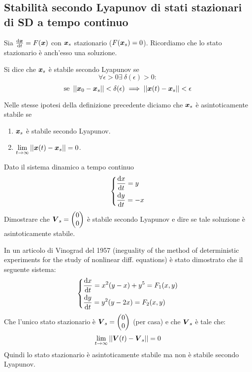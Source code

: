 \subsection{Stabilità secondo Lyapunov di stati stazionari di SD a tempo continuo}%
\label{sub:Stabilità secondo Lyapunov di stati stazionari di SD a tempo continuo}
Sia $\frac{\text{d} \boldsymbol{x}}{\text{d} t} = F(\boldsymbol{x})$  con $\boldsymbol{x}_s$ stazionario ($F(\boldsymbol{x}_s) = 0$). Ricordiamo che lo stato stazionario è anch'esso una soluzione.
\begin{defn}
    Si dice che $\boldsymbol{x}_s$ è stabile secondo Lyapunov se
    \[
	\forall \epsilon  > 0 \exists \ \delta (\epsilon) > 0:
    \] 
    \[
	\text{se } \left|\left|\boldsymbol{x}_0-\boldsymbol{x}_s\right|\right|< \delta (\epsilon) \implies  \left|\left|\boldsymbol{x} (t)-\boldsymbol{x}_s\right|\right| < \epsilon
    \] 
\end{defn}
\noindent
\begin{defn}
    Nelle stesse ipotesi della definizione precedente diciamo che $\boldsymbol{x}_s$ è asintoticamente stabile se 
    \begin{enumerate}
        \item $\boldsymbol{x}_s$ è stabile secondo Lyapunov.
	\item $\lim\limits_{t \to \infty} \left|\left|\boldsymbol{x} (t)-\boldsymbol{x}_s\right|\right|=0$.
    \end{enumerate}
\end{defn}
\noindent
\begin{ex}
    Dato il sistema dinamico a tempo continuo
    \[\begin{dcases}
        \frac{\text{d} x}{\text{d} t} = y\\
	\frac{\text{d} y}{\text{d} t} = -x
    \end{dcases}\] 
    Dimostrare che $\boldsymbol{V}_s= \begin{pmatrix} 0\\ 0 \end{pmatrix} $ è stabile secondo Lyapunov e dire se tale soluzione è asintoticamente stabile.
\end{ex}
\noindent
\begin{exmp}[Vinograd]
In un articolo di Vinograd del 1957 (ineguality of the method of deterministic experiments for the study of nonlinear diff. equations) è stato dimostrato che il seguente sistema:
\[\begin{dcases}
    \frac{\text{d} x}{\text{d} t} = x^2(y-x)+y^5 = F_1(x, y)\\
    \frac{\text{d} y}{\text{d} t} = y^2(y-2x)= F_2(x, y)
\end{dcases}\] 
Che l'unico stato stazionario è $\boldsymbol{V}_s = \begin{pmatrix} 0 \\ 0 \end{pmatrix}$ (per casa)  e che $\boldsymbol{V}_s$  è tale che:
\[
    \lim_{t \to \infty} \left|\left|\boldsymbol{V} (t)-\boldsymbol{V}_s\right|\right|=0
\] 
Quindi lo stato stazionario è asintoticamente stabile ma non è stabile secondo Lyapunov.
\end{exmp}
